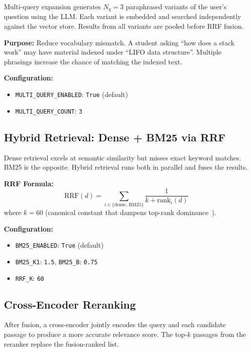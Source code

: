 \documentclass[12pt,a4paper]{article}
\begin{document}
Multi-query expansion generates $N_q = 3$ paraphrased variants of the user's question using the LLM. Each variant is embedded and searched independently against the vector store. Results from all variants are pooled before RRF fusion.

\textbf{Purpose:} Reduce vocabulary mismatch. A student asking ``how does a stack work'' may have material indexed under ``LIFO data structure''. Multiple phrasings increase the chance of matching the indexed text.

\textbf{Configuration:}
\begin{itemize}
  \item \texttt{MULTI\_QUERY\_ENABLED}: \texttt{True} (default)
  \item \texttt{MULTI\_QUERY\_COUNT}: \texttt{3}
\end{itemize}

\subsection{Hybrid Retrieval: Dense + BM25 via RRF}

Dense retrieval excels at semantic similarity but misses exact keyword matches. BM25 is the opposite. Hybrid retrieval runs both in parallel and fuses the results.

\textbf{RRF Formula:}
\begin{equation}
  \text{RRF}(d) = \sum_{i \in \{\text{dense, BM25}\}} \frac{1}{k + \text{rank}_i(d)}
  \label{eq:rrf}
\end{equation}
where $k = 60$ (canonical constant that dampens top-rank dominance~\cite{cormack2009reciprocal}).

\textbf{Configuration:}
\begin{itemize}
  \item \texttt{BM25\_ENABLED}: \texttt{True} (default)
  \item \texttt{BM25\_K1}: \texttt{1.5}, \texttt{BM25\_B}: \texttt{0.75}
  \item \texttt{RRF\_K}: \texttt{60}
\end{itemize}

\subsection{Cross-Encoder Reranking}

After fusion, a cross-encoder jointly encodes the query and each candidate passage to produce a more accurate relevance score. The top-$k$ passages from the reranker replace the fusion-ranked list.
\end{document}
